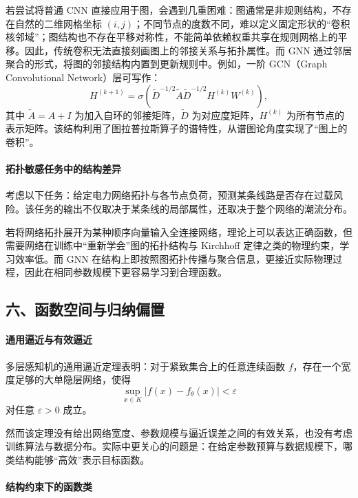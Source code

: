 若尝试将普通 CNN 直接应用于图，会遇到几重困难：图通常是非规则结构，不存在自然的二维网格坐标 $(i,j)$；不同节点的度数不同，难以定义固定形状的“卷积核邻域”；图结构也不存在平移对称性，不能简单依赖权重共享在规则网格上的平移。因此，传统卷积无法直接刻画图上的邻接关系与拓扑属性。而 GNN 通过邻居聚合的形式，将图的邻接结构内置到更新规则中。例如，一阶 GCN（Graph Convolutional Network）层可写作：
\[
H^{(k+1)} = \sigma\left(\tilde{D}^{-1/2} \tilde{A} \tilde{D}^{-1/2} H^{(k)} W^{(k)}\right),
\]
其中 $\tilde{A} = A + I$ 为加入自环的邻接矩阵，$\tilde{D}$ 为对应度矩阵，$H^{(k)}$ 为所有节点的表示矩阵。该结构利用了图拉普拉斯算子的谱特性，从谱图论角度实现了“图上的卷积”。

\paragraph{拓扑敏感任务中的结构差异}

考虑以下任务：给定电力网络拓扑与各节点负荷，预测某条线路是否存在过载风险。该任务的输出不仅取决于某条线的局部属性，还取决于整个网络的潮流分布。

若将网络拓扑展开为某种顺序向量输入全连接网络，理论上可以表达正确函数，但需要网络在训练中“重新学会”图的拓扑结构与 Kirchhoff 定律之类的物理约束，学习效率低。而 GNN 在结构上即按照图拓扑传播与聚合信息，更接近实际物理过程，因此在相同参数规模下更容易学习到合理函数。

\subsection*{六、函数空间与归纳偏置}

\paragraph{通用逼近与有效逼近}

多层感知机的通用逼近定理表明：对于紧致集合上的任意连续函数 $f$，存在一个宽度足够的大单隐层网络，使得
\[
\sup_{x\in K} |f(x) - f_\theta(x)| < \varepsilon
\]
对任意 $\varepsilon>0$ 成立。

然而该定理没有给出网络宽度、参数规模与逼近误差之间的有效关系，也没有考虑训练算法与数据分布。实际中更关心的问题是：在给定参数预算与数据规模下，哪类结构能够“高效”表示目标函数。

\paragraph{结构约束下的函数类}

